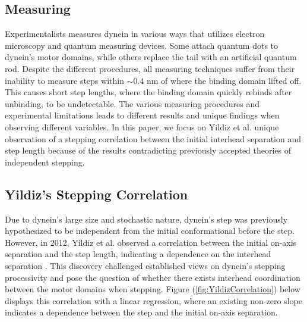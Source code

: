 \subsection{Measuring}

Experimentalists measures dynein in various ways that utilizes electron microscopy and quantum measuring devices. Some attach quantum dots to dynein's motor domains, while others replace the tail with an artificial quantum rod. Despite the different procedures, all measuring techniques suffer from their inability to measure steps within $\sim 0.4$ nm of where the binding domain lifted off. This causes short step lengths, where the binding domain quickly rebinds after unbinding, to be undetectable. The various measuring procedures and experimental limitations leads to different results and unique findings when observing different variables. In this paper, we focus on Yildiz et al. unique observation of a stepping correlation between the initial interhead separation and step length because of the results contradicting previously accepted theories of independent stepping. 


\subsection{Yildiz's Stepping Correlation}

Due to dynein's large size and stochastic nature, dynein's step was previously hypothesized to be independent from the initial conformational before the step. However, in 2012, Yildiz et al. observed a correlation between the initial on-axis separation and the step length, indicating a dependence on the interhead separation \cite{Dewitt2012}. This discovery challenged established views on dynein's stepping processivity and pose the question of whether there exists interhead coordination between the motor domains when stepping. Figure (\ref{fig:YildizCorrelation}) below displays this correlation with a linear regression, where an existing non-zero slope indicates a dependence between the step and the initial on-axis separation.

